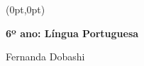 




\begingroup\thispagestyle{empty}

\begin{textblock*}{2.625in}(0pt,0pt)%
\vspace*{-3.5cm}
\end{textblock*}
                
              \vspace*{\fill}
              \begin{center}
              \bigskip

              {\LARGE\textbf{6º ano: Língua Portuguesa}}

              \bigskip
              \bigskip
              \bigskip

              {\Large
                            Fernanda Dobashi

                            }
              \end{center}
              \vspace*{\fill}

\endgroup
\pagebreak
